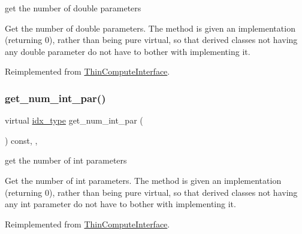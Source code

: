 get the number of double parameters 

Get the number of double parameters. The method is given an implementation (returning 0), rather than being pure virtual, so that derived classes not having any double parameter do not have to bother with implementing it. 

Reimplemented from \mbox{\hyperlink{class_s_m_spp__di__unipi__it_1_1_thin_compute_interface_a03d2492bc7caa7e7821fa1bc4f06a36e}{Thin\+Compute\+Interface}}.

\mbox{\label{class_s_m_spp__di__unipi__it_1_1_f_real_objective_a3ad74d9506761eb2ca4c8a936fb7a1c5}} 
\subsubsection{\texorpdfstring{get\+\_\+num\+\_\+int\+\_\+par()}{get\_num\_int\_par()}}
{\footnotesize\ttfamily virtual \mbox{\hyperlink{class_s_m_spp__di__unipi__it_1_1_thin_compute_interface_aa3d710629ad8c434286726ad810c3b47}{idx\+\_\+type}} get\+\_\+num\+\_\+int\+\_\+par (\begin{DoxyParamCaption}\item[{void}]{ }\end{DoxyParamCaption}) const\hspace{0.3cm}{\ttfamily [inline]}, {\ttfamily [override]}, {\ttfamily [virtual]}}



get the number of int parameters 

Get the number of int parameters. The method is given an implementation (returning 0), rather than being pure virtual, so that derived classes not having any int parameter do not have to bother with implementing it. 

Reimplemented from \mbox{\hyperlink{class_s_m_spp__di__unipi__it_1_1_thin_compute_interface_a1e009f6b43f7966bf4b4740e0b4cff58}{Thin\+Compute\+Interface}}.

\mbox{\label{class_s_m_spp__di__unipi__it_1_1_f_real_objective_a91f0341f09d59b3023fc95122a625125}} 
